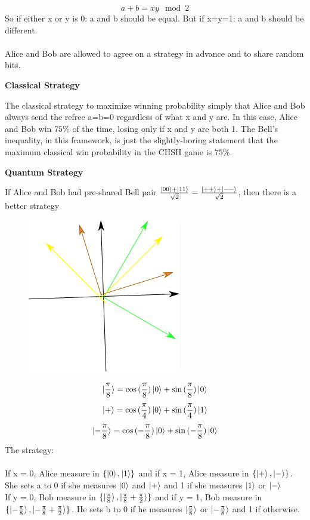 \documentclass[]{article}
\theoremstyle{nonumberplain}
\begin{document}
\begin{itemize}
\[
	a+b = xy \mod2
\] 
So if either x or y is 0: a and b should be equal. But if x=y=1: a and b should be different. \\
\\
Alice and Bob are allowed to agree on a strategy in advance and to share random bits.
\begin{center}
\textbf{Classical Strategy}
\end{center}
The classical strategy to maximize winning probability simply that Alice and Bob always send the refree a=b=0 regardless of what x and y are. In this case, Alice and Bob win $75\%$ of the time, losing only if x and y are both 1. The Bell's inequality, in this framework, is just the slightly-boring statement that the maximum classical win probability in the CHSH game is $75\%$. 
\begin{center}
\textbf{Quantum Strategy}
\end{center}
If Alice and Bob had pre-shared Bell pair $\frac{\ket{00}+\ket{11}}{\sqrt{2}}=\frac{\ket{++}+\ket{--}}{\sqrt{2}}$, then there is a better strategy
\begin{figure}[h]
	\centering
	\includegraphics[scale=0.5]{graph/5.png}
\end{figure}
\[
	\ket{\frac{\pi}{8}}=\cos{(\frac{\pi}{8})}\ket{0}+\sin{(\frac{\pi}{8})}\ket{0}
\] 
\[
	\ket{+} = \cos{(\frac{\pi}{4})}\ket{0}+\sin{(\frac{\pi}{4})}\ket{1}
\] 
\[
	\ket{-\frac{\pi}{8}}=\cos{(-\frac{\pi}{8})}\ket{0}+\sin{(-\frac{\pi}{8})}\ket{0}
\] 
The strategy:\\ \\
If x = 0, Alice measure in $\{\ket{0},\ket{1}\}$ and if x = 1, Alice measure in $\{\ket{+},\ket{-}\}$.  She sets a to 0 if she measures $\ket{0}$ and $\ket{+}$ and 1 if she measures $\ket{1}$ or $\ket{-}$ \\
If y = 0, Bob measure in $\{\ket{\frac{\pi}{8}},\ket{\frac{\pi}{8}+\frac{\pi}{2}}\}$ and if y = 1, Bob measure in $\{\ket{-\frac{\pi}{8}},\ket{-\frac{\pi}{8}+\frac{\pi}{2}}\}$. He sets b to 0 if he measures $\ket{\frac{\pi}{8}}$ or $\ket{-\frac{\pi}{8}}$ and 1 if otherwise.\\

\end{itemize}
\end{document}
